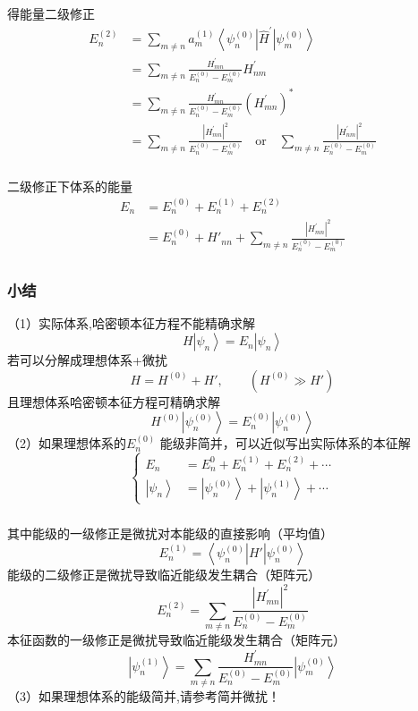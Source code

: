 \begin{frame} 
  \frametitle{}
  得能量二级修正
  \begin{equation*}
    \begin{aligned}
      E_n^{(2)} &= \sum_{m\ne n} a_m^{(1)}\left\langle \psi_n^{(0)}\right|\hat{H}^{\prime} \left|\psi_m^{(0)} \right\rangle \\
      & = \sum_{m\ne n} \frac{H ^{\prime} _{mn}}{E_n^{(0)}-E_m^{(0)}} H^{\prime}_{nm} \\
      &=  \sum_{m\ne n} \frac{H ^{\prime} _{mn}}{E_n^{(0)}-E_m^{(0)}} \left(H^{\prime}_{mn}\right)^* \\
      &= \sum_{m\ne n}  \frac{|H ^{\prime} _{mn}|^2}{E_n^{(0)}-E_m^{(0)}} \quad \text{or} \quad  \sum_{m\ne n}  \frac{|H ^{\prime} _{nm}|^2}{E_n^{(0)}-E_m^{(0)}}
    \end{aligned}  
  \end{equation*}
\end{frame} 

\begin{frame}
  \frametitle{}
二级修正下体系的能量
\[\begin{aligned}
  E_n &= E_n^{(0)} + E_n^{(1)} + E_n^{(2)} \\
   &= E_n^{(0)} + H'_{nn} + \sum_{m\ne n}  \frac{|H ^{\prime} _{mn}|^2}{E_n^{(0)}-E_m^{(0)}} \\ 
\end{aligned} \]
\end{frame} 

\begin{frame}
  \frametitle{小结}
（1）实际体系,哈密顿本征方程不能精确求解
\[ H \left|\psi_n \right\rangle = E_n \left|\psi_n \right\rangle\]
若可以分解成理想体系+微扰
\[ H = H^{(0)} + H', \qquad (H^{(0)} \gg H')\]
且理想体系哈密顿本征方程可精确求解
\[ H^{(0)}\left|\psi ^{(0)} _n \right\rangle = E^{(0)}_n \left|\psi ^{(0)} _n \right\rangle\]
（2）如果理想体系的$ E_n^{(0)} $ 能级非简并，可以近似写出实际体系的本征解
\begin{equation*}
  \boxed{\left\{\begin{aligned}
    E_n &= E_n^{0} + E_n^{(1)} + E_n^{(2)} + \cdots  \\
    \left|\psi_n \right\rangle &= \left|\psi_n^{(0)}\right\rangle +\left|\psi_n^{(1)}\right\rangle + \cdots 
  \end{aligned} \right.}
\end{equation*}    
\end{frame} 

\begin{frame}
  \frametitle{}
  其中能级的一级修正是微扰对本能级的直接影响（平均值）
  $$E_n^{(1)} = \left\langle \psi ^{(0)} _n \right|H' \left|\psi ^{(0)} _n \right\rangle $$
  能级的二级修正是微扰导致临近能级发生耦合（矩阵元）
  $$E_n^{(2)} = \sum_{m\ne n}  \frac{|H ^{\prime} _{mn}|^2}{E_n^{(0)}-E_m^{(0)}} $$
  本征函数的一级修正是微扰导致临近能级发生耦合（矩阵元） 
$$
\left|\psi_n^{(1)}\right\rangle = \sum_{m\ne n} \frac{H^{\prime}_{mn}}{E_n^{(0)}-E_m^{(0)}} \left|\psi_m^{(0)}\right\rangle  
$$ 
（3）如果理想体系的能级简并,请参考简并微扰！
\end{frame} 

